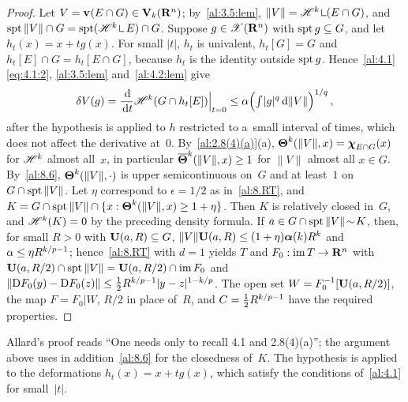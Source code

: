 \begin{proof}
    Let $V = \mathbf{v}_{}(E \cap G) \in \mathbf{V}_{k}(\mathbf{R}^{n})$; by~\ref{al:3.5:lem}, $\|V\| = \HM^{\vdim}
    \restrict (E \cap G)$, and $\spt \|V\| \cap G = \spt(\HM^{\vdim} \restrict E) \cap G$. Suppose
    $g \in \mathscr{X}(\mathbf{R}^{n})$ with $\operatorname{spt} g \subseteq G$, and let $h_t(x) = x + t g(x)$. For small
    $|t|$, $h_t$ is univalent, $h_t[G] = G$ and $h_t[E] \cap G = h_t[E \cap G]$, because $h_t$ is the
    identity outside $\operatorname{spt} g$. Hence~\ref{al:4.1}\eqref{eq:4.1:2}, \ref{al:3.5:lem}
    and~\ref{al:4.2:lem} give
    \begin{displaymath}
        \delta V(g) = \frac{\,\mathrm{d}}{\,\mathrm{d} t} \mathscr{H}^{k}(G \cap h_t[E]) \Big|_{t=0} \le \alpha \Big(
        {\textstyle\int_{}^{}} |g|^q \,\mathrm{d} \|V\| \Big)^{1/q} \,,
    \end{displaymath}
    after the hypothesis is applied to $h$ restricted to a~small interval of times, which does not
    affect the derivative at~$0$. By~\ref{al:2.8(4)(a)}(a), $\boldsymbol{\Theta}^{k}(\|V\|,x) =
    \boldsymbol{\chi}_{E \cap G}(x)$ for $\mathscr{H}^{k}$ almost all~$x$, in particular $\boldsymbol{\overline{\Theta}}^{k}(\|V\|,x) \ge
    1$ for $\|V\|$ almost all $x \in G$. By~\ref{al:8.6}, $\boldsymbol{\Theta}^{k}(\|V\|,\cdot)$ is upper
    semicontinuous on~$G$ and at least~$1$ on $G \cap \operatorname{spt} \|V\|$. Let $\eta$ correspond to
    $\epsilon = 1/2$ as in~\ref{al:8.RT}, and $K = G \cap \operatorname{spt} \|V\| \cap \{ x :
    \boldsymbol{\Theta}^{k}(\|V\|,x) \ge 1 + \eta \}$. Then $K$ is relatively closed in~$G$, and
    $\mathscr{H}^{k}(K) = 0$ by the preceding density formula. If $a \in G \cap \operatorname{spt} \|V\| \!\sim\! K$,
    then, for small $R > 0$ with $\mathbf{U}(a,R) \subseteq G$, $\|V\| \mathbf{U}(a,R) \le (1 + \eta)
    \boldsymbol{\alpha}(k) R^{k}$ and $\alpha \le \eta R^{k/p - 1}$; hence~\ref{al:8.RT} with
    $d = 1$ yields $T$ and $F_0 : \operatorname{im} T \to \mathbf{R}^{n}$ with $\mathbf{U}(a,R/2) \cap \operatorname{spt} \|V\| =
    \mathbf{U}(a,R/2) \cap \operatorname{im} F_0$ and $\|\mathrm{D} F_0(y) - \mathrm{D} F_0(z)\| \le \frac12 R^{k/p - 1} |y -
    z|^{1 - k/p}$. The open set $W = F_0^{-1}[\mathbf{U}(a,R/2)]$, the map $F = F_0 | W$, $R/2$ in
    place of~$R$, and $C = \frac12 R^{k/p - 1}$ have the required properties.
\end{proof}

\begin{remark}
    \label{rem:8.1(3)}
    Allard's proof reads ``One needs only to recall 4.1 and 2.8(4)(a)''; the argument above uses in
    addition~\ref{al:8.6} for the closedness of~$K$. The hypothesis is applied to the deformations
    $h_t(x) = x + t g(x)$, which satisfy the conditions of~\ref{al:4.1} for small~$|t|$.
\end{remark}

